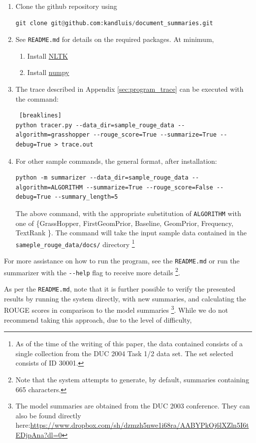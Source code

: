 \documentclass[11pt]{article}
\begin{document}
\begin{enumerate}
\item Clone the github repository using
\begin{lstlisting}[language=Python, caption="Git Clone Command"]
git clone git@github.com:kandluis/document_summaries.git
\end{lstlisting}
\item See \verb|README.md| for details on the required packages. At minimum,
\begin{enumerate}
\item Install \href{http://www.nltk.org/}{NLTK}
\item Install \href{http://www.numpy.org/}{numpy}
\end{enumerate}
\item The trace described in Appendix \ref{sec:program_trace} can be executed with the command:
\begin{lstlisting} [breaklines]
python tracer.py --data_dir=sample_rouge_data --algorithm=grasshopper --rouge_score=True --summarize=True --debug=True > trace.out
\end{lstlisting}
\item For other sample commands, the general format, after installation:
\begin{lstlisting}[breaklines]
python -m summarizer --data_dir=sample_rouge_data --algorithm=ALGORITHM --summarize=True --rouge_score=False --debug=True --summary_length=5
\end{lstlisting}
The above command, with the appropriate substitution of \verb|ALGORITHM| with one of \{GrassHopper,  FirstGeomPrior, Baseline, GeomPrior, Frequency, TextRank \}. The command will take the input sample data contained in the \verb|sameple_rouge_data/docs/| directory \footnote{As of the time of the writing of this paper, the data contained consists of a single collection from the DUC 2004 Task 1/2 data set. The set selected consists of ID 30001.}
\end{enumerate}
For more assistance on how to run the program, see the \verb|README.md| or run the summarizer with the \verb|--help| flag to receive more details \footnote{Note that the system attempts to generate, by default, summaries containing 665 characters.}.

As per the \verb|README.md|, note that it is further possible to verify the presented results by running the system directly, with new summaries, and calculating the ROUGE scores in comparison to the model summaries \footnote{The model summaries are obtained from the DUC 2003 conference. They can also be found directly here:\href{https://www.dropbox.com/sh/dzmzh5nwe1i68ra/AABYPkOj6lXZln5I6tEDjpAna?dl=0}{https://www.dropbox.com/sh/dzmzh5nwe1i68ra/AABYPkOj6lXZln5I6tEDjpAna?dl=0}}. While we do not recommend taking this approach, due to the level of difficulty,
\end{document}
